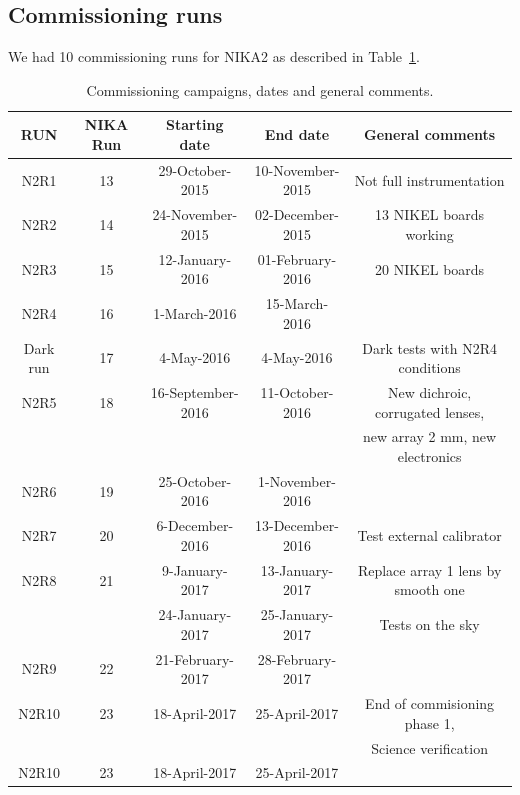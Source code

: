 \documentclass[a4paper, 11pt]{article} %
\begin{document}
\subsection{Commissioning runs}
We had 10 commissioning runs for NIKA2 as described in Table~\ref{nika2runs}.

\begin{table}[h]
\small
\caption{Commissioning campaigns, dates and general comments.
\label{nika2runs}}
\begin{tabular}{|c|c|c|c|c|}
\hline 
RUN  & NIKA Run & Starting date    & End date         &  General comments \\
\hline
N2R1     & 13       & 29-October-2015   & 10-November-2015 & Not full instrumentation        \\
N2R2     & 14       & 24-November-2015  & 02-December-2015 & 13 NIKEL boards working         \\
N2R3     & 15       & 12-January-2016   & 01-February-2016 & 20 NIKEL boards                 \\
N2R4     & 16       & 1-March-2016      & 15-March-2016    & 	                               \\
Dark run & 17       & 4-May-2016        & 4-May-2016       & Dark tests with N2R4 conditions  \\
\hline
N2R5     & 18       & 16-September-2016 & 11-October-2016  & New dichroic, corrugated lenses, \\
         &          &                   &                  &  new array 2 mm, new electronics \\
N2R6     & 19       & 25-October-2016   & 1-November-2016  &                                  \\
N2R7     & 20       & 6-December-2016   & 13-December-2016 & Test external calibrator         \\
N2R8     & 21       & 9-January-2017    & 13-January-2017  & Replace array 1 lens by smooth one \\
         &          & 24-January-2017   & 25-January-2017  & Tests on the sky   \\
N2R9     & 22       & 21-February-2017  & 28-February-2017 &                                   \\
N2R10    & 23       & 18-April-2017     & 25-April-2017    & End of commisioning phase 1,     \\
         &          &                   &                  & Science verification  \\  
N2R10  & 23       &  18-April-2017 & 25-April-2017 &    \\
\hline
\end{tabular} 
\end{table} 
\end{document}
